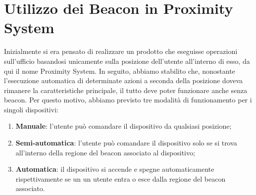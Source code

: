 \section{Utilizzo dei Beacon in Proximity System}
Inizialmente si era pensato di realizzare un prodotto che eseguisse operazioni sull'ufficio basandosi unicamente sulla posizione dell'utente all'interno di esso, da qui il nome Proximity System.
In seguito, abbiamo stabilito che, nonostante l'esecuzione automatica di determinate azioni a seconda della posizione doveva rimanere la caratteristiche principale, il tutto deve poter funzionare anche senza beacon.
Per questo motivo, abbiamo previsto tre modalità di funzionamento per i singoli dispositivi:
\begin{enumerate}
\item \textbf{Manuale}: l'utente può comandare il dispositivo da qualsiasi posizione;
\item \textbf{Semi-automatica}: l'utente può comandare il dispositivo solo se si trova all'interno della regione del beacon associato al dispositivo; 
\item \textbf{Automatica}: il dispositivo si accende e spegne automaticamente rispettivamente se un un utente entra o esce dalla regione del beacon associato.
\end{enumerate}
